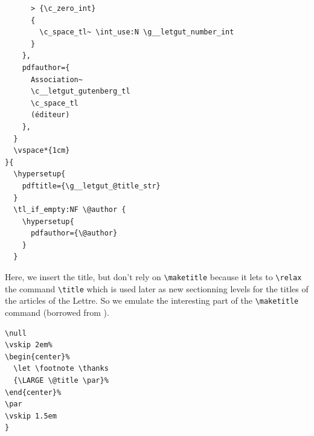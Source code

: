 \documentclass{letgut}
\begin{document}
\begin{lstlisting}
      > {\c_zero_int}
      {
        \c_space_tl~ \int_use:N \g__letgut_number_int
      }
    },
    pdfauthor={
      Association~
      \c__letgut_gutenberg_tl
      \c_space_tl
      (éditeur)
    },
  }
  \vspace*{1cm}
}{
  \hypersetup{
    pdftitle={\g__letgut_@title_str}
  }
  \tl_if_empty:NF \@author {
    \hypersetup{
      pdfauthor={\@author}
    }
  }
\end{lstlisting}
Here, we insert the title, but don't rely on \lstinline+\maketitle+ because it lets to
\lstinline+\relax+ the command \lstinline+\title+ which is used later as new sectionning levels
for the titles of the articles of the Lettre. So we emulate the interesting
part of the \lstinline+\maketitle+ command (borrowed from ).
\begin{lstlisting}
\null
\vskip 2em%
\begin{center}%
  \let \footnote \thanks
  {\LARGE \@title \par}%
\end{center}%
\par
\vskip 1.5em
}
\end{lstlisting}
\end{document}
